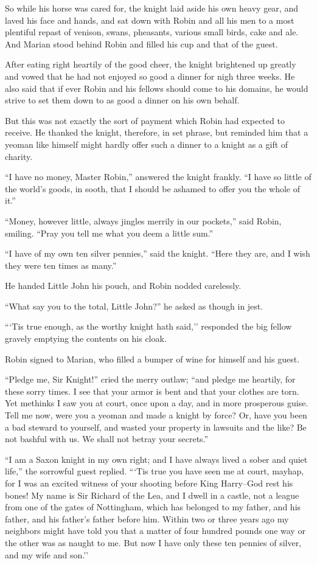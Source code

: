 So while his horse was cared for, the knight laid aside his own heavy
gear, and laved his face and hands, and sat down with Robin and all his
men to a most plentiful repast of venison, swans, pheasants, various
small birds, cake and ale. And Marian stood behind Robin and filled his
cup and that of the guest.

After eating right heartily of the good cheer, the knight brightened up
greatly and vowed that he had not enjoyed so good a dinner for nigh
three weeks. He also said that if ever Robin and his fellows should come
to his domains, he would strive to set them down to as good a dinner on
his own behalf.

But this was not exactly the sort of payment which Robin had expected to
receive. He thanked the knight, therefore, in set phrase, but reminded
him that a yeoman like himself might hardly offer such a dinner to a
knight as a gift of charity.

``I have no money, Master Robin,'' answered the knight frankly. ``I have
so little of the world's goods, in sooth, that I should be ashamed to
offer you the whole of it.''

``Money, however little, always jingles merrily in our pockets,'' said
Robin, smiling. ``Pray you tell me what you deem a little sum.''

``I have of my own ten silver pennies,'' said the knight. ``Here they
are, and I wish they were ten times as many.''

He handed Little John his pouch, and Robin nodded carelessly.

``What say you to the total, Little John?'' he asked as though in jest.

```Tis true enough, as the worthy knight hath said,'' responded the big
fellow gravely emptying the contents on his cloak.

Robin signed to Marian, who filled a bumper of wine for himself and his
guest.

``Pledge me, Sir Knight!'' cried the merry outlaw; ``and pledge me
heartily, for these sorry times. I see that your armor is bent and that
your clothes are torn. Yet methinks I saw you at court, once upon a day,
and in more prosperous guise. Tell me now, were you a yeoman and made a
knight by force? Or, have you been a bad steward to yourself, and wasted
your property in lawsuits and the like? Be not bashful with us. We shall
not betray your secrets.''

``I am a Saxon knight in my own right; and I have always lived a sober
and quiet life,'' the sorrowful guest replied. ```Tis true you have seen
me at court, mayhap, for I was an excited witness of your shooting
before King Harry--God rest his bones! My name is Sir Richard of the
Lea, and I dwell in a castle, not a league from one of the gates of
Nottingham, which has belonged to my father, and his father, and his
father's father before him. Within two or three years ago my neighbors
might have told you that a matter of four hundred pounds one way or the
other was as naught to me. But now I have only these ten pennies of
silver, and my wife and son.''

